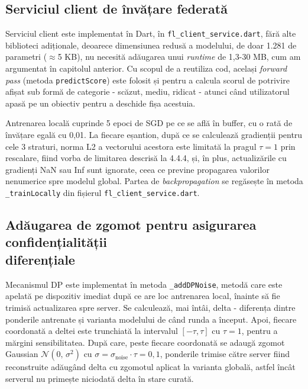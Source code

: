 \documentclass[12pt,a4paper]{report}
\begin{document}
\subsection{Serviciul client de învățare federată}

Serviciul client este implementat în Dart, în \texttt{fl\_client\_service.dart}, fără alte biblioteci adiționale, deoarece dimensiunea redusă a modelului, de doar 1.281 de parametri ($\approx$5 KB), nu necesită adăugarea unui \textit{runtime} de 1,3-30 MB, cum am argumentat în capitolul anterior. Cu scopul de a reutiliza cod, același \textit{forward pass} (metoda \texttt{predictScore}) este folosit și pentru a calcula scorul de potrivire afișat sub formă de categorie - scăzut, mediu, ridicat - atunci când utilizatorul apasă pe un obiectiv pentru a deschide fișa acestuia.

Antrenarea locală cuprinde 5 epoci de SGD pe ce se află în buffer, cu o rată de învățare egală cu 0,01. La fiecare eșantion, după ce se calculează gradienții pentru cele 3 straturi, norma L2 a vectorului acestora este limitată la pragul $\tau=1$ prin rescalare, fiind vorba de limitarea descrisă la 4.4.4, și, în plus, actualizările cu gradienți NaN sau Inf sunt ignorate, ceea ce previne propagarea valorilor nenumerice spre modelul global. Partea de \textit{backpropagation} se regăsește în metoda \texttt{\_trainLocally} din fișierul \texttt{fl\_client\_service.dart}.

\subsection{Adăugarea de zgomot pentru asigurarea confidențialității\\diferențiale}

Mecanismul DP este implementat în metoda \texttt{\_addDPNoise}, metodă care este apelată pe dispozitiv imediat după ce are loc antrenarea local, înainte să fie trimisă actualizarea spre server. Se calculează, mai întâi, delta - diferența dintre ponderile antrenate și varianta modelului de când runda a început. Apoi, fiecare coordonată a deltei este trunchiată la intervalul $[-\tau, \tau]$ cu $\tau=1$, pentru a mărgini sensibilitatea. După care, peste fiecare coordonată se adaugă zgomot Gaussian $\mathcal{N}(0,\,\sigma^2)$ cu $\sigma = \sigma_{\mathrm{noise}} \cdot \tau = 0{,}1$, ponderile trimise către server fiind reconstruite adăugând delta cu zgomotul aplicat la varianta globală, astfel încât serverul nu primește niciodată delta în stare curată.
\end{document}
